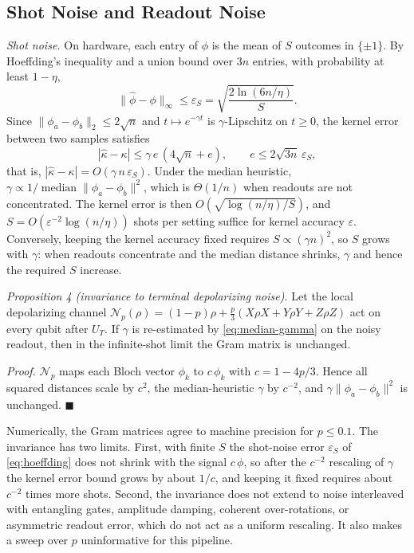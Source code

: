 \documentclass[conference]{IEEEtran}
\begin{document}
\subsection{Shot Noise and Readout Noise}
\label{sec:noise}

\textit{Shot noise.} On hardware, each entry of $\phi$ is the mean of $S$ outcomes in $\{\pm1\}$. By Hoeffding's inequality and a union bound over $3n$ entries, with probability at least $1-\eta$,
\begin{equation}
    \|\hat{\phi}-\phi\|_\infty\le\varepsilon_S=\sqrt{\frac{2\ln(6n/\eta)}{S}}.
    \label{eq:hoeffding}
\end{equation}
Since $\|\phi_a-\phi_b\|_2\le2\sqrt{n}$ and $t\mapsto e^{-\gamma t}$ is $\gamma$-Lipschitz on $t\ge0$, the kernel error between two samples satisfies
\begin{equation}
    |\hat{\kappa}-\kappa|\le\gamma\,e\,(4\sqrt{n}+e),\qquad e\le2\sqrt{3n}\,\varepsilon_S,
    \label{eq:kernel-error}
\end{equation}
that is, $|\hat{\kappa}-\kappa|=O(\gamma\,n\,\varepsilon_S)$. Under the median heuristic, $\gamma\propto1/\operatorname{median}\|\phi_a-\phi_b\|^2$, which is $\Theta(1/n)$ when readouts are not concentrated. The kernel error is then $O(\sqrt{\log(n/\eta)/S})$, and $S=O(\varepsilon^{-2}\log(n/\eta))$ shots per setting suffice for kernel accuracy $\varepsilon$. Conversely, keeping the kernel accuracy fixed requires $S\propto(\gamma n)^2$, so $S$ grows with $\gamma$: when readouts concentrate and the median distance shrinks, $\gamma$ and hence the required $S$ increase.

\textit{Proposition 4 (invariance to terminal depolarizing noise).} Let the local depolarizing channel $\mathcal{N}_p(\rho)=(1-p)\rho+\tfrac{p}{3}(X\rho X+Y\rho Y+Z\rho Z)$ act on every qubit after $U_T$. If $\gamma$ is re-estimated by \eqref{eq:median-gamma} on the noisy readout, then in the infinite-shot limit the Gram matrix is unchanged.

\textit{Proof.} $\mathcal{N}_p$ maps each Bloch vector $\phi_k$ to $c\,\phi_k$ with $c=1-4p/3$. Hence all squared distances scale by $c^2$, the median-heuristic $\gamma$ by $c^{-2}$, and $\gamma\|\phi_a-\phi_b\|^2$ is unchanged. $\blacksquare$

Numerically, the Gram matrices agree to machine precision for $p\le0.1$. The invariance has two limits. First, with finite $S$ the shot-noise error $\varepsilon_S$ of \eqref{eq:hoeffding} does not shrink with the signal $c\,\phi$, so after the $c^{-2}$ rescaling of $\gamma$ the kernel error bound grows by about $1/c$, and keeping it fixed requires about $c^{-2}$ times more shots. Second, the invariance does not extend to noise interleaved with entangling gates, amplitude damping, coherent over-rotations, or asymmetric readout error, which do not act as a uniform rescaling. It also makes a sweep over $p$ uninformative for this pipeline.
\end{document}
